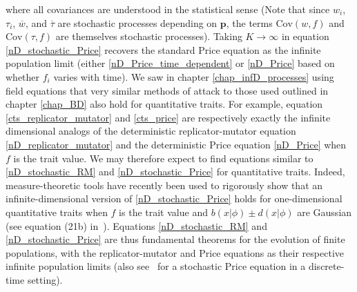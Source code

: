 where all covariances are understood in the statistical sense (Note that since $w_i$, $\tau_i$, $\overline{w}$, and $\overline{\tau}$ are stochastic processes depending on $\mathbf{p}$, the terms $\textrm{Cov}(w,f)$ and $\textrm{Cov}(\tau,f)$ are themselves stochastic processes). Taking $K \to \infty$ in equation \eqref{nD_stochastic_Price} recovers the standard Price equation as the infinite population limit (either \eqref{nD_Price_time_dependent} or \eqref{nD_Price} based on whether $f_i$ varies with time). We saw in chapter \ref{chap_infD_processes} using field equations that very similar methods of attack to those used outlined in chapter \eqref{chap_BD} also hold for quantitative traits. For example, equation \eqref{cts_replicator_mutator} and \eqref{cts_price} are respectively exactly the infinite dimensional analogs of the deterministic replicator-mutator equation \eqref{nD_replicator_mutator} and the deterministic Price equation \eqref{nD_Price} when $f$ is the trait value. We may therefore expect to find equations similar to \eqref{nD_stochastic_RM} and \eqref{nD_stochastic_Price} for quantitative traits. Indeed, measure-theoretic tools have recently been used to rigorously show that an infinite-dimensional version of \eqref{nD_stochastic_Price} holds for one-dimensional quantitative traits when $f$ is the trait value and $b(x|\phi) \pm d(x|\phi)$ are Gaussian (see equation (21b) in~\cite{week_white_2021}). Equations \eqref{nD_stochastic_RM} and \eqref{nD_stochastic_Price} are thus fundamental theorems for the evolution of finite populations, with the replicator-mutator and Price equations as their respective infinite population limits (also see~\citep{rice_universal_2020} for a stochastic Price equation in a discrete-time setting).

